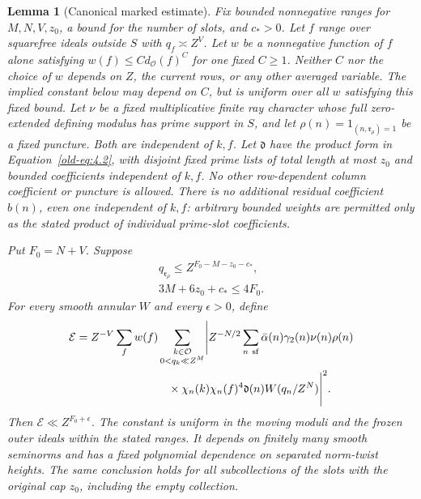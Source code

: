 \documentclass[11pt,a4paper]{article}
\numberwithin{equation}{section}
\numberwithin{figure}{section}
\newtheorem{lemma}[theorem]{Lemma}
\theoremstyle{definition}
\theoremstyle{remark}
\begin{document}
\begin{lemma}[Canonical marked estimate]\label{lem:canonical-moment}
Fix bounded nonnegative ranges for \(M,N,V,z_0\), a bound for the number
of slots, and \(c_*>0\).  Let \(f\) range over squarefree ideals outside
\(S\) with \(q_f\asymp Z^V\).  Let \(w\) be a nonnegative function of
\(f\) alone satisfying \(w(f)\le C d_{\mathcal O}(f)^C\) for one fixed
\(C\ge1\).  Neither \(C\) nor the choice of \(w\) depends on \(Z\),
the current rows, or any other averaged variable.  The implied constant
below may depend on \(C\), but is uniform over all \(w\) satisfying this
fixed bound.  Let \(\nu\) be a fixed
multiplicative finite ray character whose full zero-extended defining
modulus has prime support in \(S\), and let
\(\rho(n)=1_{(n,\mathfrak r_\rho)=1}\) be a fixed puncture.  Both are
independent of \(k,f\).  Let \(\mathfrak d\) have the product form in
Equation~\eqref{old-eq:4.2}, with disjoint fixed prime lists of total
length at most \(z_0\) and bounded coefficients independent of \(k,f\).
No other row-dependent column coefficient or puncture is allowed.
There is no additional residual coefficient \(b(n)\), even one
independent of \(k,f\): arbitrary bounded weights are permitted only
as the stated product of individual prime-slot coefficients.

Put \(F_0=N+V\).  Suppose
\begin{equation}\label{eq:invariant}
 \begin{gathered}
 q_{\mathfrak r_\rho}\le Z^{F_0-M-z_0-c_*},\\
 3M+6z_0+c_*\le4F_0.
 \end{gathered}
\end{equation}
For every smooth annular \(W\) and every \(\epsilon>0\), define
\begin{equation}\label{eq:canonical-energy}
 \begin{split}
 \mathcal E={}&Z^{-V}\sum_f w(f)
 \sum_{\substack{k\in\mathcal O\\0<q_k\ll Z^M}}
 \Biggl|Z^{-N/2}\sum_{n\ {\rm sf}}
 \bar\alpha(n)\gamma_2(n)\nu(n)\rho(n)\\
 &\hspace{24mm}\times
 \chi_n(k)\chi_n(f)^4\mathfrak d(n)W(q_n/Z^N)\Biggr|^2.
 \end{split}
\end{equation}
Then \(\mathcal E\ll Z^{F_0+\epsilon}\).  The constant is uniform in
the moving moduli and the frozen outer ideals within the stated ranges.
It depends on finitely many smooth seminorms and has a fixed polynomial
dependence on separated norm-twist heights.  The same conclusion holds
for all subcollections of the slots with the original cap \(z_0\),
including the empty collection.
\end{lemma}
\end{document}
